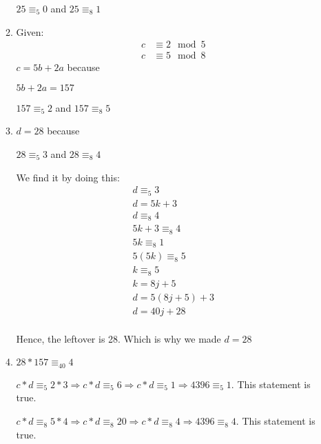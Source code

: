 \documentclass[12pt,fleqn]{article}
\begin{document}
\begin{enumerate}
\begin{enumerate}
    $25 \equiv_5 0$ and $25 \equiv_8 1$
    
    \item Given:
    \begin{equation*}
      \begin{split}
        c & \equiv 2 \mod 5 \\
        c & \equiv 5 \mod 8
      \end{split}
    \end{equation*}
    $c = 5b + 2a$ because
    
    $5b + 2a = 157$ 
    
    $157 \equiv_5 2$ and $157 \equiv_8 5$
    
    \item 
    $d = 28$ because 
    
    $28 \equiv_5 3$ and $28 \equiv_8 4$
    
    We find it by doing this:
    \begin{equation*}
    		\begin{split}
			d \equiv_5 3 \\
			d = 5k + 3 \\
			d \equiv_8 4 \\
			5k + 3 \equiv_8 4 \\
			5k \equiv_8 1 \\
			5(5k) \equiv_8 5 \\
			k \equiv_8 5 \\
			k = 8j + 5 \\
			d = 5(8j + 5) + 3 \\
			d = 40j + 28 \\
    		\end{split}
    \end{equation*}
    
    Hence, the leftover is 28. Which is why we made $d = 28$
    
    \item
	$28 * 157 \equiv_40 4$
	
	$c * d \equiv_5 2 * 3 \Rightarrow c * d \equiv_5 6 \Rightarrow c * d \equiv_5 1 \Rightarrow 4396 \equiv_5 1$. This statement is true. 
	
	$c * d \equiv_8 5 * 4 \Rightarrow c * d \equiv_8 20 \Rightarrow c * d \equiv_8 4 \Rightarrow 4396 \equiv_8 4$. This statement is true. 
    
  \end{enumerate}
  

\end{enumerate}
\end{document}

